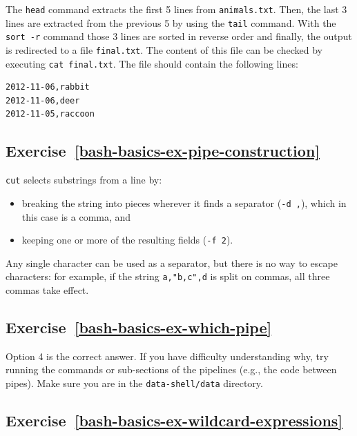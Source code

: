 \documentclass[
]{krantz}
\providecommand{\tightlist}{%
  \setlength{\itemsep}{0pt}\setlength{\parskip}{0pt}}
\begin{document}
The \texttt{head} command extracts the first 5 lines from \texttt{animals.txt}.
Then, the last 3 lines are extracted from the previous 5 by using the \texttt{tail} command.
With the \texttt{sort\ -r} command those 3 lines are sorted in reverse order and finally,
the output is redirected to a file \texttt{final.txt}.
The content of this file can be checked by executing \texttt{cat\ final.txt}.
The file should contain the following lines:

\begin{verbatim}
2012-11-06,rabbit
2012-11-06,deer
2012-11-05,raccoon
\end{verbatim}

\hypertarget{exercise-refbash-basics-ex-pipe-construction}{%
\subsection*{Exercise~\ref{bash-basics-ex-pipe-construction}}\label{exercise-refbash-basics-ex-pipe-construction}}


\texttt{cut} selects substrings from a line by:

\begin{itemize}
\tightlist
\item
  breaking the string into pieces wherever it finds a separator (\texttt{-d\ ,}),
  which in this case is a comma, and
\item
  keeping one or more of the resulting fields (\texttt{-f\ 2}).
\end{itemize}

Any single character can be used as a separator,
but there is no way to escape characters:
for example, if the string \texttt{a,"b,c",d} is split on commas,
all three commas take effect.

\hypertarget{exercise-refbash-basics-ex-which-pipe}{%
\subsection*{Exercise~\ref{bash-basics-ex-which-pipe}}\label{exercise-refbash-basics-ex-which-pipe}}


Option 4 is the correct answer.
If you have difficulty understanding why,
try running the commands or sub-sections of the pipelines
(e.g., the code between pipes).
Make sure you are in the \texttt{data-shell/data} directory.

\hypertarget{exercise-refbash-basics-ex-wildcard-expressions}{%
\subsection*{Exercise~\ref{bash-basics-ex-wildcard-expressions}}\label{exercise-refbash-basics-ex-wildcard-expressions}}
\end{document}
